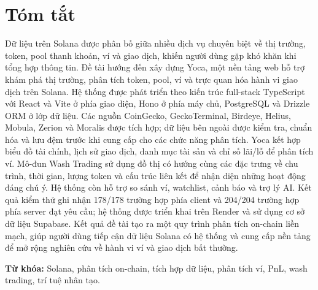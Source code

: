 \chapter*{Tóm tắt}
\label{summary}

Dữ liệu trên Solana được phân bố giữa nhiều dịch vụ chuyên biệt về thị trường, token, pool thanh khoản, ví và giao dịch, khiến người dùng gặp khó khăn khi tổng hợp thông tin. Đề tài hướng đến xây dựng Yoca, một nền tảng web hỗ trợ khám phá thị trường, phân tích token, pool, ví và trực quan hóa hành vi giao dịch trên Solana. Hệ thống được phát triển theo kiến trúc full-stack TypeScript với React và Vite ở phía giao diện, Hono ở phía máy chủ, PostgreSQL và Drizzle ORM ở lớp dữ liệu. Các nguồn CoinGecko, GeckoTerminal, Birdeye, Helius, Mobula, Zerion và Moralis được tích hợp; dữ liệu bên ngoài được kiểm tra, chuẩn hóa và lưu đệm trước khi cung cấp cho các chức năng phân tích. Yoca kết hợp biểu đồ tài chính, lịch sử giao dịch, danh mục tài sản và chỉ số lãi/lỗ để phân tích ví. Mô-đun Wash Trading sử dụng đồ thị có hướng cùng các đặc trưng về chu trình, thời gian, lượng token và cấu trúc liên kết để nhận diện những hoạt động đáng chú ý. Hệ thống còn hỗ trợ so sánh ví, watchlist, cảnh báo và trợ lý AI. Kết quả kiểm thử ghi nhận 178/178 trường hợp phía client và 204/204 trường hợp phía server đạt yêu cầu; hệ thống được triển khai trên Render và sử dụng cơ sở dữ liệu Supabase. Kết quả đề tài tạo ra một quy trình phân tích on-chain liền mạch, giúp người dùng tiếp cận dữ liệu Solana có hệ thống và cung cấp nền tảng để mở rộng nghiên cứu về hành vi ví và giao dịch bất thường.

\textbf{Từ khóa:} Solana, phân tích on-chain, tích hợp dữ liệu, phân tích ví, PnL, wash trading, trí tuệ nhân tạo.
